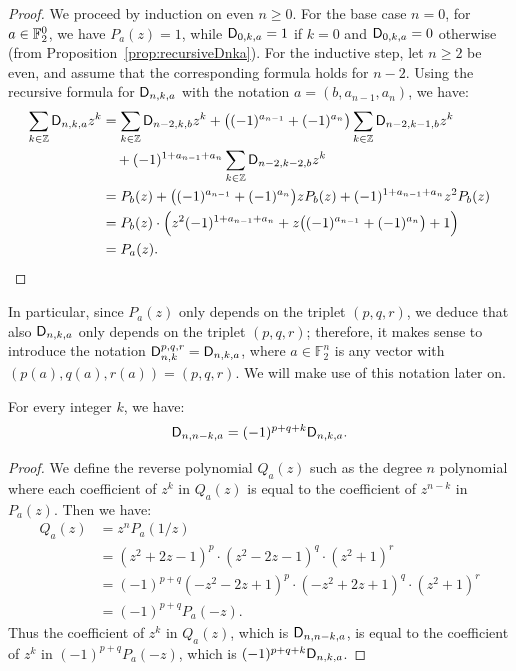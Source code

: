 \documentclass[11pt]{llncs}
\begin{document}
\begin{proof}
	We proceed by induction on even $n\geq 0$. 
	For the base case $n=0$, for $a\in\mathbb{F}_2^0$, we have $P_a(z)=1$, while $\mathsf{D}_{0,k,a}=1$ if $k=0$ and $\mathsf{D}_{0,k,a}=0$ otherwise (from Proposition~\ref{prop:recursiveDnka}). 
	For the inductive step, let $n\geq 2$ be even, and assume that the corresponding formula holds for $n-2$. Using the recursive formula for $\mathsf{D}_{n,k,a}$ with the notation $a=(b,a_{n-1},a_n)$, we have:
	\begin{align*}
	\begin{split}
	\sum_{k\in\mathbb{Z}}\mathsf{D}_{n,k,a} z^k&=\sum_{k\in\mathbb{Z}}\mathsf{D}_{n-2,k,b}z^k+\big((-1)^{a_{n-1}}+(-1)^{a_{n}}\big)\sum_{k\in\mathbb{Z}}\mathsf{D}_{n-2,k-1,b}z^k\\
	&\quad+(-1)^{1+a_{n-1}+a_n}\sum_{k\in\mathbb{Z}}\mathsf{D}_{n-2,k-2,b}z^k\\
	&=P_b(z)+\big((-1)^{a_{n-1}}+(-1)^{a_{n}}\big)zP_b(z)+(-1)^{1+a_{n-1}+a_n}z^2P_b(z)\\
	&=P_b(z)\cdot\Big(z^2(-1)^{1+a_{n-1}+a_n}+z\big((-1)^{a_{n-1}}+(-1)^{a_{n}}\big)+1\Big)\\
	&=P_a(z).\qedhere
	\end{split}
	\end{align*}
\end{proof}

\begin{remark}
    In particular, since $P_a(z)$ only depends on the triplet $(p,q,r)$, we deduce that also $\mathsf{D}_{n,k,a}$ only depends on the triplet $(p,q,r)$; therefore, it makes sense to introduce the notation $\mathsf D_{n,k}^{p,q,r}=\mathsf{D}_{n,k,a}$, where $a\in\mathbb F_2^n$ is any vector with $(p(a),q(a),r(a))=(p,q,r)$. We will make use of this notation later on.
\end{remark}




\begin{proposition}\label{proposition:symmetry}
	For every integer $k$, we have:
	\[	\mathsf{D}_{n,n-k,a}=(-1)^{p+q+k}\mathsf{D}_{n,k,a}.	\]
\end{proposition}

\begin{proof}
	We define the reverse polynomial  $Q_a(z)$ such as the degree $n$ polynomial where each coefficient of $z^k$ in $Q_a(z)$ is equal to the coefficient of $z^{n-k}$ in $P_a(z)$. 
	Then we have:
	\begin{align*}
	Q_a(z)&=z^nP_a(1/z)\\
	&=(z^2+2z-1)^p\cdot(z^2-2z-1)^q\cdot(z^2+1)^r\\
	&=(-1)^{p+q}(-z^2-2z+1)^p\cdot(-z^2+2z+1)^q\cdot(z^2+1)^r\\
	&=(-1)^{p+q}P_a(-z).
	\end{align*}
	Thus the coefficient of $z^k$ in $Q_a(z)$, which is $\mathsf{D}_{n,n-k,a}$, is equal to the coefficient of $z^k$ in $(-1)^{p+q}P_a(-z)$, which is $(-1)^{p+q+k}\mathsf{D}_{n,k,a}$.
\end{proof}
\end{document}
